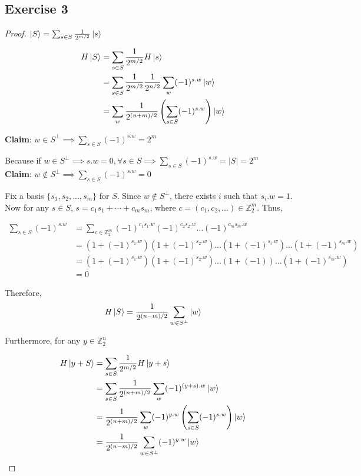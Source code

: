\documentclass{article}
\begin{document}
\subsection*{Exercise 3}
\begin{proof}
$\ket S = \sum_{s \in S} \frac{1}{2^{m/2}} \ket s$

\begin{align*}
    H\ket S &=  \sum_{s \in S} \frac{1}{2^{m/2}} H\ket s \\
    &=  \sum_{s \in S} \frac{1}{2^{m/2}} \frac{1}{2^{n/2}} \sum_{w} (-1)^{s.w} \ket w \\
    &=  \sum_{w} \frac{1}{2^{(n+m)/2}} \left(\sum_{s \in S} (-1)^{s.w} \right) \ket w \\
\end{align*}

\textbf{Claim}: $w \in S^{\perp} \implies \sum_{s \in S} (-1)^{s.w} = 2^m$

Because if $w \in S^{\perp} \implies s.w = 0, \forall s \in S \implies \sum_{s \in S} (-1)^{s.w} = |S| = 2^m$ \\

\textbf{Claim}: $w \not \in S^{\perp} \implies \sum_{s \in S} (-1)^{s.w} = 0$

Fix a basis $\{s_1, s_2, \ldots, s_m\}$ for $S$. Since $w \not \in S^{\perp}$, there exists $i$ such that $s_i.w = 1$. Now for any $s \in S$, $s = c_1s_1 + \cdots + c_ms_m$, where $c = (c_1, c_2, \ldots) \in \mathbb{Z}_2^m$. Thus,

\begin{align*}
    \sum_{s \in S} (-1)^{s.w} &= \sum_{c \in \mathbb{Z}_2^m} (-1)^{c_1 s_1.w}(-1)^{c_2 s_2.w} \ldots (-1)^{c_m s_m.w} \\
    &= (1 + (-1)^{s_1.w})(1 + (-1)^{s_2.w}) \ldots (1 + (-1)^{s_i.w}) \ldots (1 + (-1)^{s_m.w}) \\
    &= (1 + (-1)^{s_1.w})(1 + (-1)^{s_2.w}) \ldots (1 + (-1)) \ldots (1 + (-1)^{s_m.w}) \\
    &= 0
\end{align*}

Therefore, 
$$H\ket S = \frac{1}{2^{(n-m)/2}} \sum_{w \in S^{\perp}} \ket w$$

Furthermore, for any $y \in \mathbb{Z}_2^n$

\begin{align*}
    H\ket{y+S} &=  \sum_{s \in S} \frac{1}{2^{m/2}} H\ket{y+s} \\
    &=  \sum_{s \in S} \frac{1}{2^{(n+m)/2}} \sum_{w} (-1)^{(y+s).w} \ket w \\
    &=  \frac{1}{2^{(n+m)/2}} \sum_{w} (-1)^{y.w} \left(\sum_{s \in S} (-1)^{s.w} \right) \ket w \\
    &= \frac{1}{2^{(n-m)/2}} \sum_{w \in S^{\perp}} (-1)^{y.w}\ket w
\end{align*}

\end{proof}
\end{document}
